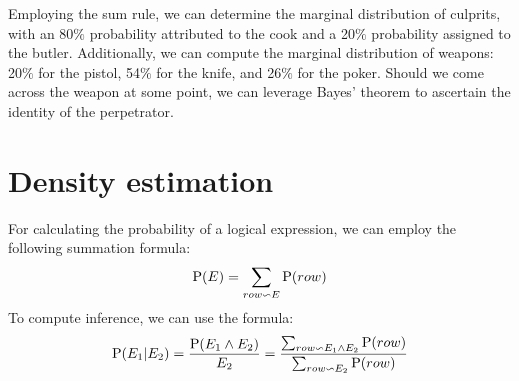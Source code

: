 \documentclass[12pt, a4paper]{report}
\begin{document}
\begin{example}
        Employing the sum rule, we can determine the marginal distribution of culprits, with an 80$\%$ probability attributed to the cook and a 20$\%$ probability assigned to the butler. 
        Additionally, we can compute the marginal distribution of weapons: 20$\%$ for the pistol, 54$\%$ for the knife, and 26$\%$ for the poker.
        Should we come across the weapon at some point, we can leverage Bayes' theorem to ascertain the identity of the perpetrator.
    \end{example}

    \section{Density estimation}
    For calculating the probability of a logical expression, we can employ the following summation formula:
    \[\textnormal{P}(E)=\sum_{row \backsim E}\textnormal{P}(row)\]
    To compute inference, we can use the formula:
    \[\textnormal{P}(E_1|E_2)=\dfrac{\textnormal{P}(E_1 \land E_2)}{E_2}=\dfrac{\sum_{row \backsim E_1 \land E_2}\textnormal{P}(row)}{\sum_{row \backsim E_2}\textnormal{P}(row)}\]
\end{document}
